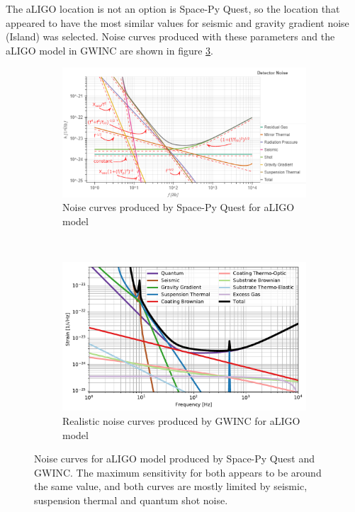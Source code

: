 \documentclass{article}
\begin{document}
The aLIGO location is not an option is Space-Py Quest, so the location that appeared to have the most similar values for seismic and gravity gradient noise (Island) was selected. Noise curves produced with these parameters and the aLIGO model in GWINC are shown in figure \ref{fig::SPQGWINCaLIGO}. 


 \begin{figure}[h!]
     \centering
         \begin{subfigure}{.9\textwidth}
        \centering
         \includegraphics[width=1\linewidth,trim = {0 0 0 0.7cm}, clip]{SPQaLIGOscalings.pdf}
         \caption{Noise curves produced by Space-Py Quest for aLIGO model}
         \label{fig::PowerStages}
         \end{subfigure}%
         \\
        \begin{subfigure}{.8\textwidth}
        \centering
         \includegraphics[width=1\linewidth]{gwinc_aLIGO.pdf}
         \caption{Realistic noise curves produced by GWINC for aLIGO model}
         \label{fig::PowerStagesMass}
         \end{subfigure}
         \caption{Noise curves for aLIGO model produced by Space-Py Quest and GWINC. The maximum sensitivity for both appears to be around the same value, and both curves are mostly limited by seismic, suspension thermal and quantum shot noise.}
         \label{fig::SPQGWINCaLIGO}
 \end{figure}
\end{document}
